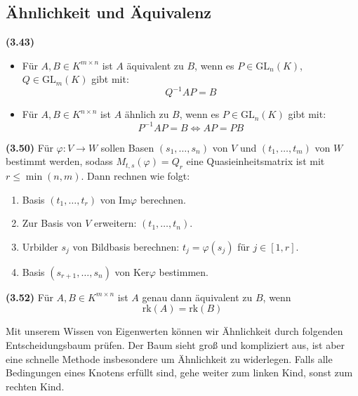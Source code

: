 \documentclass[a4paper,parskip=half*,DIV=15,fontsize=11pt]{scrartcl}
\newlength{\hangwidth}
\newcommand{\skript}[1]{\settowidth{\hangwidth}{\textbf{(#1)} }\hangpara{\hangwidth}{1}\textbf{(#1)} \ignorespaces} %
\newcommand{\rk}{\mathrm{rk}} %
\newcommand{\GL}{\mathrm{GL}} %
\newcommand{\Ker}{\mathrm{Ker}} %
\renewcommand{\Im}{\mathrm{Im}} %
\newcommand{\geo}{\mathrm{g}} %
\newcommand{\mul}{\mathrm{m}} %
\begin{document}
\subsection{Ähnlichkeit und Äquivalenz}

\skript{3.43} \begin{itemize}
	\item Für $A, B \in K^{m \times n}$ ist $A$ äquivalent zu $B$, wenn es $P \in \GL_n(K)$, $Q \in \GL_m(K)$ gibt mit: $$Q^{-1} A P = B$$
	\item Für $A, B \in K^{n \times n}$ ist $A$ ähnlich zu $B$, wenn es $P \in \GL_n(K)$ gibt mit: $$P^{-1} A P = B \iff A P = P B$$
\end{itemize}

\skript{3.50} Für $\varphi : V \to W$ sollen Basen $(s_1, \ldots, s_n)$ von $V$ und $(t_1, \ldots, t_m)$ von $W$ bestimmt werden, sodass $M_{t,s}(\varphi) = Q_r$ eine Quasieinheitsmatrix ist mit $r \leq \min(n, m)$. Dann rechnen wie folgt: \begin{enumerate}
    \item Basis $(t_1, \ldots, t_r)$ von $\Im \varphi$ berechnen.
    \item Zur Basis von $V$ erweitern: $(t_1, \ldots, t_n)$.
    \item Urbilder $s_j$ von Bildbasis berechnen: $t_j = \varphi(s_j)$ für $j \in [1, r]$.
    \item Basis $(s_{r+1}, \ldots, s_n)$ von $\Ker \varphi$ bestimmen.
\end{enumerate}

\skript{3.52} Für $A, B \in K^{m \times n}$ ist $A$ genau dann äquivalent zu $B$, wenn $$\rk(A) = \rk(B)$$

Mit unserem Wissen von Eigenwerten können wir Ähnlichkeit durch folgenden Entscheidungsbaum prüfen. Der Baum sieht groß und kompliziert aus, ist aber eine schnelle Methode insbesondere um Ähnlichkeit zu widerlegen. Falls alle Bedingungen eines Knotens erfüllt sind, gehe weiter zum linken Kind, sonst zum rechten Kind.

\end{document}

